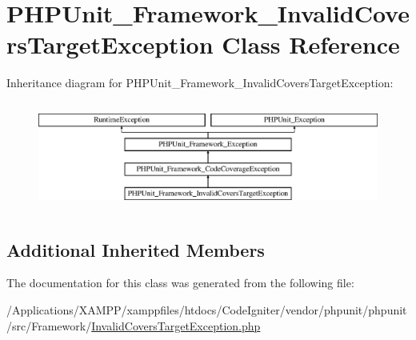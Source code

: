 \hypertarget{class_p_h_p_unit___framework___invalid_covers_target_exception}{}\section{P\+H\+P\+Unit\+\_\+\+Framework\+\_\+\+Invalid\+Covers\+Target\+Exception Class Reference}
\label{class_p_h_p_unit___framework___invalid_covers_target_exception}
Inheritance diagram for P\+H\+P\+Unit\+\_\+\+Framework\+\_\+\+Invalid\+Covers\+Target\+Exception\+:\begin{figure}[H]
\begin{center}
\leavevmode
\includegraphics[height=3.589744cm]{class_p_h_p_unit___framework___invalid_covers_target_exception}
\end{center}
\end{figure}
\subsection*{Additional Inherited Members}


The documentation for this class was generated from the following file\+:\begin{DoxyCompactItemize}
\item 
/\+Applications/\+X\+A\+M\+P\+P/xamppfiles/htdocs/\+Code\+Igniter/vendor/phpunit/phpunit/src/\+Framework/\mbox{\hyperlink{_invalid_covers_target_exception_8php}{Invalid\+Covers\+Target\+Exception.\+php}}\end{DoxyCompactItemize}
